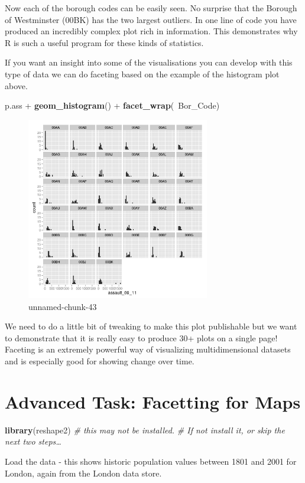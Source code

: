 \documentclass[]{article}
\newenvironment{Shaded}{}{}
\newcommand{\KeywordTok}[1]{\textcolor[rgb]{0.00,0.44,0.13}{\textbf{{#1}}}}
\newcommand{\CommentTok}[1]{\textcolor[rgb]{0.38,0.63,0.69}{\textit{{#1}}}}
\newcommand{\NormalTok}[1]{{#1}}
\begin{document}
Now each of the borough codes can be easily seen. No surprise that the
Borough of Westminster (00BK) has the two largest outliers. In one line
of code you have produced an incredibly complex plot rich in
information. This demonstrates why R is such a useful program for these
kinds of statistics.

If you want an insight into some of the visualisations you can develop
with this type of data we can do faceting based on the example of the
histogram plot above.

\begin{Shaded}
\begin{Highlighting}[]
\NormalTok{p.ass + }\KeywordTok{geom_histogram}\NormalTok{() + }\KeywordTok{facet_wrap}\NormalTok{(~Bor_Code)}
\end{Highlighting}
\end{Shaded}
\begin{figure}[htbp]
\centering
\includegraphics[width=8cm]{figure/unnamed-chunk-43.png}
\caption{unnamed-chunk-43}
\end{figure}

We need to do a little bit of tweaking to make this plot publishable but
we want to demonstrate that it is really easy to produce 30+ plots on a
single page! Faceting is an extremely powerful way of visualizing
multidimensional datasets and is especially good for showing change over
time.

\section{Advanced Task: Facetting for Maps}

\begin{Shaded}
\begin{Highlighting}[]
\KeywordTok{library}\NormalTok{(reshape2)  }\CommentTok{# this may not be installed. }
\CommentTok{# If not install it, or skip the next two steps…}
\end{Highlighting}
\end{Shaded}
Load the data - this shows historic population values between 1801 and
2001 for London, again from the London data store.
\end{document}
